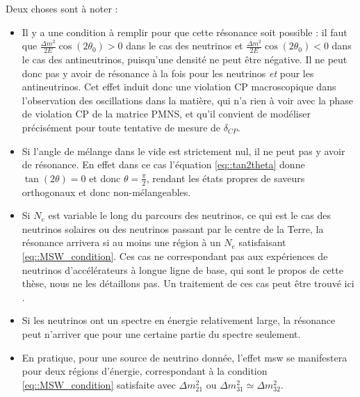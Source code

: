             Deux choses sont à noter : 
            \begin{itemize}
                \item Il y a une condition à remplir pour que cette résonance soit possible : il faut que $\frac{\Delta m^2}{2E}\cos(2\theta_0) > 0$ dans le cas des neutrinos et $\frac{\Delta m^2}{2E}\cos(2\theta_0) < 0$ dans le cas des antineutrinos, puisqu'une densité ne peut être négative. Il ne peut donc pas y avoir de résonance à la fois pour les neutrinos \textit{et} pour les antineutrinos. Cet effet induit donc une violation CP macroscopique dans l'observation des oscillations dans la matière, qui n'a rien à voir avec la phase de violation CP de la matrice PMNS, et qu'il convient de modéliser précisément pour toute tentative de mesure de $\delta_{CP}$.
                \item Si l'angle de mélange dans le vide est strictement nul, il ne peut pas y avoir de résonance. En effet dans ce cas l'équation \eqref{eq::tan2theta} donne $\tan(2\theta)=0$ et donc $\theta=\frac{\pi}{2}$, rendant les états propres de saveurs orthogonaux et donc non-mélangeables.
                \item Si $N_e$ est variable le long du parcours des neutrinos, ce qui est le cas des neutrinos solaires ou des neutrinos passant par le centre de la Terre, la résonance arrivera si au moins une région à un $N_e$ satisfaisant \eqref{eq::MSW_condition}. Ces cas ne correspondant pas aux expériences de neutrinos d'accélérateurs à longue ligne de base, qui sont le propos de cette thèse, nous ne les détaillons pas. Un traitement de ces cas peut être trouvé ici \cite{Akhmedov2000}.
                \item Si les neutrinos ont un spectre en énergie relativement large, la résonance peut n'arriver que pour une certaine partie du spectre seulement.
                \item En pratique, pour une source de neutrino donnée, l'effet \gls{msw} se manifestera pour deux régions d'énergie, correspondant à la condition \eqref{eq::MSW_condition} satisfaite avec $\Delta m^2_{21}$ ou $\Delta m^2_{31}\simeq\Delta m^2_{32}$.
            \end{itemize}
                
            
